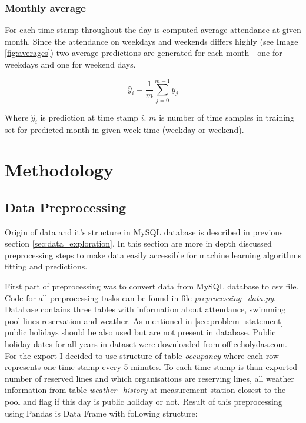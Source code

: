 \documentclass{article}
\begin{document}
\subsubsection{Monthly average} \label{sec:monthly_average}
For each time stamp throughout the day is computed average attendance at given month. Since the attendance on weekdays and weekends differs highly (see Image \ref{fig:averages}) two average predictions are generated for each month - one for weekdays and one for weekend days. 

\begin{equation}
\label{eq:monthly_avg}
\hat{y}_i = \dfrac{1}{m} \sum^{m-1}_{j=0}y_j
\end{equation}

Where $\hat{y}_i$ is prediction at time stamp $i$. $m$ is number of time samples in training set for predicted month in given week time (weekday or weekend).

\section{Methodology}
\subsection{Data Preprocessing} \label{sec:data_preprocessing}
Origin of data and it's structure in MySQL database is described in previous section \ref{sec:data_exploration}. In this section are more in depth discussed preprocessing steps to make data easily accessible for machine learning algorithms fitting and predictions.

First part of preprocessing was to convert data from MySQL database to csv file. Code for all preprocessing tasks can be found in file \emph{preprocessing\_data.py}. Database contains three tables with information about attendance, swimming pool lines reservation and weather. As mentioned in \ref{sec:problem_statement} public holidays should be also used but are not present in database. Public holiday dates for all years in dataset were downloaded from \href{https://www.officeholidays.com/countries/czech-republic}{officeholydas.com}. For the export I decided to use structure of table \emph{occupancy} where each row represents one time stamp every 5 minutes. To each time stamp is than exported number of reserved lines and which organisations are reserving lines, all weather information from table \emph{weather\_history} at measurement station closest to the pool and flag if this day is public holiday or not. Result of this preprocessing using Pandas is Data Frame with following structure:
\end{document}
